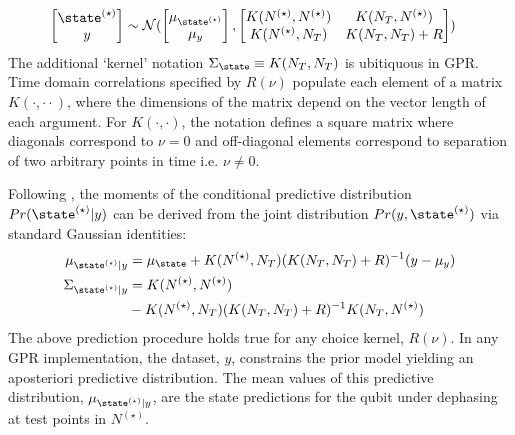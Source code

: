 \begin{align}
\begin{bmatrix} \state^{(\star)} \\y \end{bmatrix} & \sim \mathcal{N} (\begin{bmatrix} \mu_{\state^{(\star)}} \\ \mu_y
\end{bmatrix} , \begin{bmatrix}   K(N^{(\star)},N^{(\star)})&K(N_T,N^{(\star)}) \\ K(N^{(\star)},N_T) & K(N_T,N_T) + R \end{bmatrix} )
\end{align}
The additional `kernel' notation $\Sigma_\state  \equiv K(N_T, N_T)$ is ubitiquous in GPR. Time domain correlations specified by $R(\nu)$ populate each element of a matrix $K(\cdot, \cdot \cdot)$, where the dimensions of the matrix depend on the vector length of each argument. For $K(\cdot{},\cdot)$, the notation defines a square matrix where diagonals correspond to $\nu=0$ and off-diagonal elements correspond to separation of two arbitrary points in time i.e. $\nu \neq 0 $. 
 
Following \cite{rasmussen2005gaussian}, the moments of the conditional predictive distribution $Pr(\state^{(\star)}|y)$ can be derived from the joint distribution $Pr(y,\state^{(\star)})$ via standard Gaussian identities:
\begin{align}
\mu_{\state^{(\star)}|y} &= \mu_\state + K(N^{(\star)},N_T)(K(N_T,N_T) + R )^{-1} (y - \mu_y) \\
\Sigma_{\state^{(\star)}|y} &= K(N^{(\star)},N^{(\star)}) \nonumber \\
& - K(N^{(\star)},N_T)(K(N_T, N_T) + R)^{-1}K(N_T,N^{(\star)}) 
\end{align}
The above prediction procedure holds true for any choice kernel, $R(\nu)$. In any GPR implementation, the dataset, $y$, constrains the prior model yielding an aposteriori predictive distribution. The mean values of this predictive distribution, $\mu_{\state^{(\star)}|y}$, are the state predictions for the qubit under dephasing at test points in $N^{(\star)}$.

